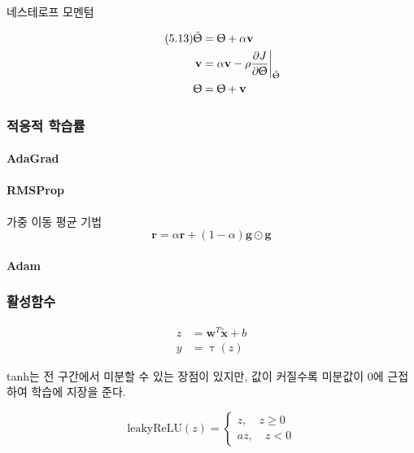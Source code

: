 \documentclass [12pt] {oblivoir}
\let\oldsubsubsection=\subsubsection
\renewcommand{\subsubsection}
{
  \filbreak
  \oldsubsubsection
}
\begin{document}
네스테로프 모멘텀

\begin{align*} \tag{5.13}
    \tilde{\Uptheta} &= \Uptheta + \alpha \mathbf{v} \\
     \mathbf{v} &= \alpha \mathbf{v} - \rho \frac{\partial J}{\partial \Uptheta}\bigg|_{\tilde{\Uptheta}} \\
    \Uptheta &= \Uptheta + \mathbf{v}
\end{align*}


\subsubsection{적응적 학습률}

\paragraph*{AdaGrad}\mbox{}

\vspace{3mm}

\paragraph*{RMSProp}\mbox{}

가중 이동 평균 기법
\begin{equation} \tag{5.14}
  \mathbf{r} = \alpha \mathbf{r} + (1 - \alpha)\mathbf{g} \odot \mathbf{g}
\end{equation}

\vspace{3mm}

\paragraph*{Adam}\mbox{}

\vspace{3mm}

\subsubsection{활성함수}

\begin{align*} \tag{5.15}
  z &= \mathbf{w}^{T}\tilde{\mathbf{x}} + b \\
  y &= \uptau(z)
\end{align*}

tanh는 전 구간에서 미분할 수 있는 장점이 있지만, 값이 커질수록 미분값이 0에 근접하여 학습에 지장을 준다.

\begin{equation} \tag{5.17}
  \mathrm{leakyReLU}(z) =
  \begin{cases}
    z, \quad z \ge 0 \\
    az, \quad z < 0
  \end{cases}
\end{equation}
\end{document}
